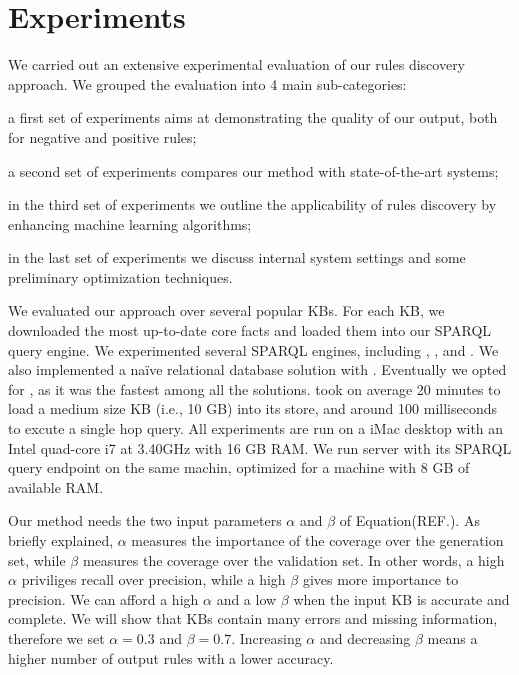 \section{Experiments} \label{sec:experiment}
We carried out an extensive experimental evaluation of our rules discovery approach.
We grouped the evaluation into 4 main sub-categories: 
\begin{inparaenum}[\itshape(i)]
	\item a first set of experiments aims at demonstrating the quality of our output, both for negative and positive rules;
	\item a second set of experiments compares our method with state-of-the-art systems;
	\item in the third set of experiments we outline the applicability of rules discovery by enhancing machine learning algorithms;
	\item in the last set of experiments we discuss internal system settings and some preliminary optimization techniques.
\end{inparaenum}

We evaluated our approach over several popular KBs. For each KB, we downloaded the most up-to-date core facts and loaded them into our SPARQL query engine. We experimented several SPARQL engines, including , , and . We also implemented a na\"ive relational database solution with . Eventually we opted for , as it was the fastest among all the solutions.  took on average 20 minutes to load a medium size KB (i.e., 10 GB) into its store, and around 100 milliseconds to excute a single hop query. All experiments are run on a iMac desktop with
an Intel quad-core i7 at 3.40GHz with 16 GB RAM. We run  server with its SPARQL query endpoint on the same machin, optimized for a machine with 8 GB of available RAM.

Our method needs the two input parameters $\alpha$ and $\beta$ of Equation(REF.). As briefly explained, $\alpha$ measures the importance of the coverage over the generation set, while $\beta$ measures the coverage over the validation set. In other words, a high $\alpha$ priviliges recall over precision, while a high $\beta$ gives more importance to precision. We can afford a high $\alpha$ and a low $\beta$ when the input KB is accurate and complete. We will show that KBs contain many errors and missing information, therefore we set $\alpha = 0.3$ and $\beta = 0.7$. Increasing $\alpha$ and decreasing $\beta$ means a higher number of output rules with a lower accuracy. 

